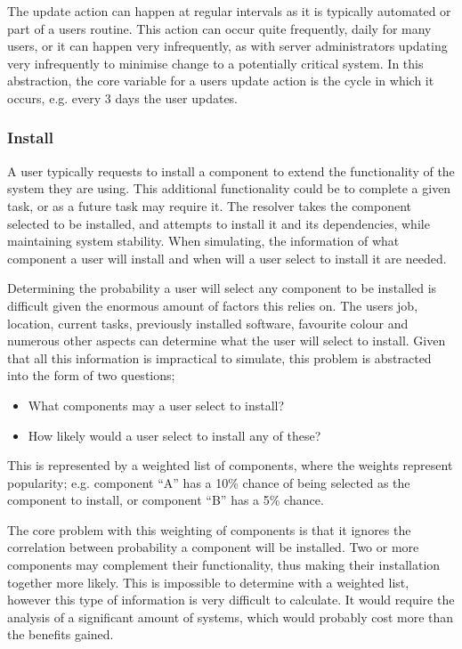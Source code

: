 The update action can happen at regular intervals as it is typically automated or part of a users routine.
This action can occur quite frequently, daily for many users, 
or it can happen very infrequently, 
as with server administrators updating very infrequently to minimise change to a potentially critical system.
In this abstraction, the core variable for a users update action is the cycle in which it occurs,
e.g. every 3 days the user updates.

\subsubsection{Install}
A user typically requests to install a component to extend the functionality of the system they are using.
This additional functionality could be to complete a given task, or as a future task may require it. 
The resolver takes the component selected to be installed, and attempts to install it and its dependencies, while maintaining system stability.
When simulating, the information of what component a user will install and when will a user select to install it are needed. 

Determining the probability a user will select any component to be installed is difficult given the enormous amount of factors this relies on.
The users job, location, current tasks, previously installed software, favourite colour and numerous other aspects can determine what the user will select to install.
Given that all this information is impractical to simulate, this problem is abstracted into the form of two questions;
\begin{itemize}
  \item What components may a user select to install?
  \item How likely would a user select to install any of these?
\end{itemize}
This is represented by a weighted list of components, where the weights represent popularity;
e.g. component ``A'' has a 10\% chance of being selected as the component to install, or component ``B'' has a 5\% chance.

The core problem with this weighting of components is that it ignores the correlation between probability a component will be installed. 
Two or more components may complement their functionality, thus making their installation together more likely.
This is impossible to determine with a weighted list, however this type of information is very difficult to calculate.
It would require the analysis of a significant amount of systems, which would probably cost more than the benefits gained.


